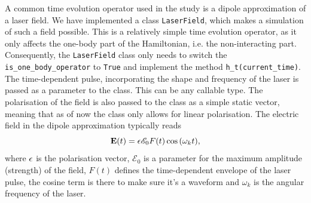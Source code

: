 

A common time evolution operator used in the study is a dipole approximation of 
a laser field. We have implemented a class \lstinline{LaserField}, which makes 
a simulation of such a field possible. This is a relatively simple time evolution 
operator, as it only affects the one-body part of the Hamiltonian, i.e. the 
non-interacting part. Consequently, the \lstinline{LaserField} class only needs 
to switch the \lstinline{is_one_body_operator} to \lstinline{True} and implement 
the method \lstinline{h_t(current_time)}. The time-dependent pulse, incorporating the 
shape and frequency of the laser is passed as a parameter to the class. This can be 
any callable type. The polarisation of the field is also passed to the class 
as a simple static vector, meaning that as of now the class only allows for 
linear polarisation. 
The electric field in the dipole approximation typically 
reads
\begin{equation}
    \vb{E}(t) = \vb{\epsilon} \mathscr{E}_0 F(t)\cos{(\omega_k t)},
\end{equation}
where $\vb{\epsilon}$ is the polarisation vector, $\mathscr{E}_0$ is a parameter 
for the maximum amplitude (strength) of the field, $F(t)$ defines the time-dependent 
envelope of the laser pulse, the cosine term is there to make sure it's a waveform and
$\omega_k$ is the angular frequency of the laser.


